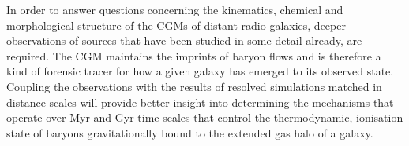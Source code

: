 \documentclass[10pt,a4paper]{article}
\begin{document}
In order to answer questions concerning the kinematics, chemical and morphological structure of the CGMs of distant radio galaxies, deeper observations of sources that have been studied in some detail already, are required. The CGM maintains the imprints of baryon flows and is therefore a kind of forensic tracer for how a given galaxy has emerged to its observed state. Coupling the observations with the results of resolved simulations matched in distance scales will provide better insight into determining the mechanisms that operate over Myr and Gyr time-scales that control the thermodynamic, ionisation state of baryons gravitationally bound to the extended gas halo of a galaxy.

\newpage


\end{document}
